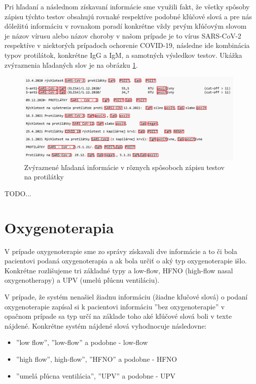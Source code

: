 Pri hľadaní a následnom získavaní informácie sme využili fakt, že všetky spôsoby zápisu týchto testov obsahujú rovnaké respektíve podobné kľúčové slová a pre nás dôležitú informáciu v rovnakom poradí konkrétne vždy prvým kľúčovým slovom je názov vírusu alebo názov choroby v našom prípade je to vírus SARS-CoV-2 respektíve v niektorých prípadoch ochorenie COVID-19, následne ide kombinácia typov protilátok, konkrétne IgG a IgM, a samotných výsledkov testov. Ukážka zvýraznenia hľadaných slov je na obrázku \ref{obr:proti_high}.

\begin{figure}
	\centerline{\includegraphics[width=1\textwidth]{images/protilatky_highlight}}
	\caption[Protilátky zvýraznené]{Zvýraznené hľadaná informácie v rôznych spôsoboch zápisu testov na protilátky}
	\label{obr:proti_high}
\end{figure}

TODO...

\section{Oxygenoterapia}

V prípade oxygenoterapie sme zo správy získavali dve informácie a to či bola pacientovi podaná oxygenoterapia a ak bola určiť o aký typ oxygenoterapie išlo. Konkrétne rozlišujeme tri základné typy a low-flow, HFNO (high-flow nasal oxygenotherapy) a UPV (umelú pľúcnu ventiláciu). 

V prípade, že systém nenašiel žiadnu informáciu (žiadne kľučové slová) o podaní oxygenoterapie zapísal si k pacientovi informáciu ''bez oxygenoterapie'' v opačnom prípade sa typ určí na základe toho aké kľúčové slová boli v texte nájdené. Konkrétne systém nájdené slová vyhodnocuje následovne:

\begin{itemize}
	\item ''low flow'', ''low-flow'' a podobne - low-flow
	\item ''high flow'', high-flow'', ''HFNO'' a podobne - HFNO
	\item ''umelá pľúcna ventilácia'', ''UPV'' a podobne - UPV
\end{itemize}

